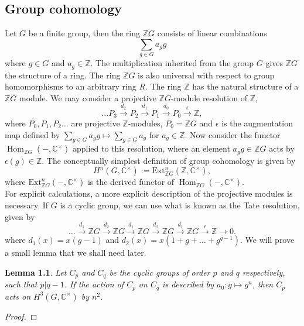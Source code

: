 \documentclass[11pt]{book}
\newtheorem{Lem}[theorem]{Lemma}
\theoremstyle{Rem}
\theoremstyle{definition}
\numberwithin{equation}{section}
\newcommand\Hom{\operatorname{Hom}}
\newcommand\CC{\mathbb C}
\newcommand\ZZ{\mathbb Z}
\newcommand\Z{\mathbb Z}
\newcommand{\ra}\rightarrow
\newcommand{\xra}\xrightarrow
\begin{document}
\begin{appendix}
\chapter{Group cohomology}
Let $G$ be a finite group, then the ring $\ZZ G$ consists of linear combinations \begin{equation}
	\sum_{g\in G} a_g g
\end{equation} where $g \in G$ and $a_g\in \ZZ$. The multiplication inherited from the group $G$ gives $\ZZ G$ the structure of a ring. The ring $\ZZ G$ is also universal with respect to group homomorphisms to an arbitrary ring $R$.
The ring $\ZZ$ has the natural structure of a $\ZZ G$ module. We may consider a projective $\ZZ G$-module resolution of $\ZZ$, \begin{equation}
	\dots P_3 \xra{d_2} P_2 \xra{d_1} P_1 \xra{d_0} P_0\xra{\epsilon} \Z,
\end{equation}  where $ P_0, P_1, P_2\dots$ are projective $\ZZ$-modules, $P_0 = \ZZ G$ and $\epsilon$ is the augmentation map defined by $\sum_{g\in G} a_g g \mapsto \sum_{g\in G}a_g$ for $a_g \in \ZZ$. Now consider the functor $\Hom_{\ZZ G} (-, \CC^\times)$ applied to this resolution, where an element $a_gg \in \ZZ G$ acts by $\epsilon(g)\in \ZZ$. The conceptually simplest definition of group cohomology is given by \begin{equation}
	H^n(G, \CC^\times) := \text{Ext}^n_{\ZZ G}(\ZZ, \CC^\times),
\end{equation}
where $\text{Ext}^n_{\ZZ G} (-, \CC^\times)$ is the derived functor of $\Hom_{\ZZ G}(-, \CC^\times)$.\\
For explicit calculations, a more explicit description of the projective modules is necessary. If $G$ is a cyclic group, we can use what is known as the Tate resolution, given by \begin{equation}\dots\xra{d_1}
\ZZ G \xra{d_2}\ZZ G\xra{d_1} \ZZ G \xra{d_2} \ZZ G\xra{d_1} \ZZ G\xra{\epsilon}\ZZ\ra 0.	\label{tate}
\end{equation} where $d_1 (x) = x(g-1)$ and $d_2(x) = x(1+g + \dots + g^{q-1}) $.
We will prove a small lemma that we shall need later.
\begin{Lem}
Let $C_p$ and $C_q$ be the cyclic groups of order $p$ and $q$ respectively, such that $p|q-1$. If the action of $C_p$ on $C_q$ is described by $a_0: g\mapsto g^n$, then $C_p$ acts on $H^3(G, \CC^\times)$ by $n^2$.
\end{Lem}
\begin{proof}

\end{proof}
\end{appendix}
\end{document}
